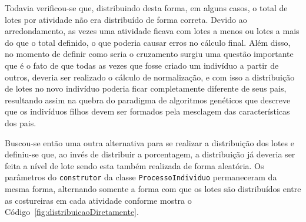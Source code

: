  \par Todavia verificou-se que, distribuindo desta forma, em alguns casos, o total de lotes por atividade não era distribuído
 de forma correta. Devido ao arredondamento, as vezes uma atividade ficava com lotes a menos ou lotes a mais do que o total
 definido, o que poderia causar erros no cálculo final. Além disso, no momento de definir como seria o cruzamento 
 surgiu uma questão importante que é o fato de que todas as vezes que fosse criado um indivíduo a partir de outros, deveria
 ser realizado o cálculo de normalização, e com isso a distribuição de lotes no novo indivíduo poderia ficar completamente
 diferente de seus pais, resultando assim na quebra do paradigma de algoritmos genéticos que descreve que os indivíduos filhos
 devem ser formados pela mesclagem das características dos pais. 


\par Buscou-se então uma outra alternativa para se realizar a distribuição dos lotes e definiu-se que, ao invés de distribuir
a porcentagem, a distribuição já deveria ser feita a nível de lote sendo esta também realizada de forma aleatória. Os parâmetros
do \texttt{construtor} da classe \texttt{ProcessoIndividuo} permaneceram da mesma forma, alternando somente a forma com que 
os lotes são distribuídos entre as costureiras em cada atividade conforme mostra
o Código~\ref{fig:distribuicaoDiretamente}.


